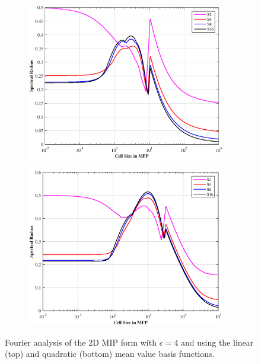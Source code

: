 \begin{figure}
\centering
	\begin{subfigure}[b]{0.80\textwidth}
		\centering
		\includegraphics[width=0.95\textwidth]{figures/sec_DSA/SI_MIP_quad_C=4_UMV1_LS.eps}
	\end{subfigure}
	\vfill
	\begin{subfigure}[b]{0.80\textwidth}
		\centering
		\includegraphics[width=0.95\textwidth]{figures/sec_DSA/SI_MIP_quad_C=4_UMV2_LS.eps}
	\end{subfigure}
\caption{Fourier analysis of the 2D MIP form with $c=4$ and using the linear (top) and quadratic (bottom) mean value basis functions.}
\label{fig::DSA_2D1G_Fourier_MV}
\end{figure}

